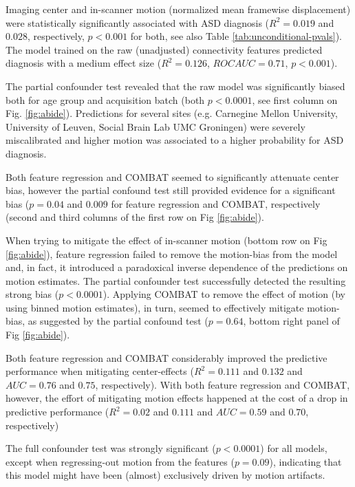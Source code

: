 \documentclass{article}
\begin{document}
Imaging center and in-scanner motion (normalized mean framewise displacement) were statistically significantly associated with ASD diagnosis ($R^2=0.019$ and $0.028$, respectively, $p<0.001$ for both, see also Table \ref{tab:unconditional-pvals}). The model trained on the raw (unadjusted) connectivity features predicted diagnosis with a medium effect size ($R^2=0.126$, $ROC AUC = 0.71$, $p<0.001$).

The partial confounder test revealed that the raw model was significantly biased both for age group and acquisition batch (both $p<0.0001$, see first column on Fig. \ref{fig:abide}). Predictions for several sites (e.g. Carnegine Mellon University, University of Leuven, Social Brain Lab UMC Groningen) were severely miscalibrated and higher motion was associated to a higher probability for ASD diagnosis.

Both feature regression and COMBAT seemed to significantly attenuate center bias, however the partial confound test still provided evidence for a significant bias ($p=0.04$ and $0.009$ for feature regression and COMBAT, respectively (second and third columns of the first row on Fig \ref{fig:abide}). 

When trying to mitigate the effect of in-scanner motion (bottom row on Fig \ref{fig:abide}), feature regression failed to remove the motion-bias from the model and, in fact, it introduced a paradoxical inverse dependence of the predictions on motion estimates. The partial confounder test successfully detected the resulting strong bias ($p<0.0001$). Applying COMBAT to remove the effect of motion (by using binned motion estimates), in turn, seemed to effectively mitigate motion-bias, as suggested by the partial confound test ($p=0.64$, bottom right panel of Fig \ref{fig:abide}).

Both feature regression and COMBAT considerably improved the predictive performance when mitigating center-effects ($R^2=0.111$ and $0.132$ and $AUC=0.76$ and $0.75$, respectively). With both feature regression and COMBAT, however, the effort of mitigating motion effects happened at the cost of a drop in predictive performance ($R^2=0.02$ and $0.111$ and $AUC=0.59$ and $0.70$, respectively)

The full confounder test was strongly significant ($p<0.0001$) for all models, except when regressing-out motion from the features ($p=0.09$), indicating that this model might have been (almost) exclusively driven by motion artifacts.
\end{document}
